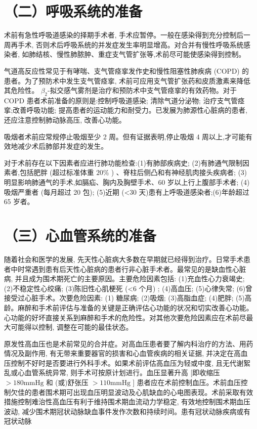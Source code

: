 \documentclass[10pt]{article}
\begin{document}
\section*{（二）呼吸系统的准备}
术前有急性呼吸道感染的择期手术者, 手术应暂停。一般在感染得到充分控制后一周再手术, 否则术后呼吸系统的并发症发生率明显增高。对合并有慢性呼吸系统感染者, 如肺结核、慢性肺脓肿、重症支气管扩张等,术前尽可能使感染得到控制。

气道高反应性常见于有哮喘、支气管痉挛发作史和慢性阻塞性肺疾病 (COPD) 的患者。为了预防术中发生支气管痉挛, 术前可应用支气管扩张药和皮质激素来降低其危险性。 $\beta_{2}$-拟交感气雾剂是治疗和预防术中支气管痉挛的有效药物。对于 COPD 患者术前准备的原则是:控制呼吸道感染; 清除气道分泌物; 治疗支气管痉挛;改善呼吸功能; 提高患者的运动能力和耐受力。已发展为肺源性心脏病的患者, 还应注意控制肺动脉高压, 改善心功能。

吸烟者术前应常规停止吸烟至少 2 周。但有证据表明,停止吸烟 4 周以上,才可能有效地减少术后肺部并发症的发生。

对于术前存在以下因素者应进行肺功能检查:(1)有肺部疾病史; (2)有肺通气限制因素者,包括肥胖 (超过标准体重 $20 \%$ ) 、脊柱后侧凸和有神经肌肉接头疾病者; (3)明显影响肺通气的手术,如膈疝、胸内及胸壁手术、60 岁以上行上腹部手术者; (4)吸烟严重者 (每月超过 20 包); (5)近期 (<30 天)患有上呼吸道感染者;(6)年龄超过 65 岁者。

\section*{（三）心血管系统的准备}
随着社会和医学的发展, 先天性心脏病大多数在早期就已经得到治疗。日常手术患者中时常遇到患有后天性心脏病的患者行非心脏手术者。最常见的是缺血性心脏病, 并且成为围术期死亡的主要原因。主要危险因素包括: (1)充血性心力衰竭史; (2)不稳定性心绞痛; (3)陈旧性心肌梗死 (<6 个月) ; (4)高血压; (5)心律失常; (6)曾接受过心脏手术。次要危险因素: (1) 糖尿病; (2)吸烟; (3)高脂血症; (4)肥胖; (5)高龄。麻醉和手术前评估与准备的关键是正确评估心功能的状况和切实改善心功能。心功能的好坏直接关系到麻醉和手术的危险性。对其他次要危险因素应在术前尽最大可能得以控制, 调整在可能的最佳状态。

原发性高血压也是术前常见的合并症。对高血压患者要了解内科治疗的方法、用药情况及副作用, 有无带来重要器官的损害和心血管疾病的相关证据, 并决定在高血压控制不好时是否要进行外科手术。如果术前评估高血压为轻或中度, 且无代谢絮乱或心血管系统异常, 则手术可按原计划进行。血压显著升高 [即收缩压 $>180 \mathrm{mmHg}$ 和 (或)舒张压 $>110 \mathrm{mmHg}$ ] 患者应在术前控制血压。术前血压控制欠佳的患者围术期可出现血压明显波动及心肌缺血的心电图表现。术前采取有效措施控制难治性高血压有利于维持围术期血流动力学稳定, 有效地控制围术期血压波动, 减少围术期冠状动脉缺血事件发作次数和持续时间。患有冠状动脉疾病或有冠状动脉
\end{document}
